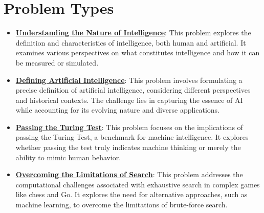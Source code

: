 \documentclass{article}%
\begin{document}
\section{Problem Types}%
\label{sec:ProblemTypes}%
\begin{itemize}[leftmargin=*]%
\item \href{https://purdue.brightspace.com/d2l/common/assets/pdfjs-d2l-dist/1.0.14-legacy/web/viewer.html?file=\%2Fcontent\%2Fenforced\%2F1095467-wl.202510.CS.24300.001\%2F02L2-Intro.pdf\%3Fou\%3D1095467\&lang=en-us\&container=d2l-fileviewer-rendered-pdf\&fullscreen=d2l-fileviewer-rendered-pdf-dialog\&height=667#page=5}{\textbf{Understanding the Nature of Intelligence}}: This problem explores the definition and characteristics of intelligence, both human and artificial. It examines various perspectives on what constitutes intelligence and how it can be measured or simulated.%
\item \href{https://purdue.brightspace.com/d2l/common/assets/pdfjs-d2l-dist/1.0.14-legacy/web/viewer.html?file=\%2Fcontent\%2Fenforced\%2F1095467-wl.202510.CS.24300.001\%2F02L2-Intro.pdf\%3Fou\%3D1095467\&lang=en-us\&container=d2l-fileviewer-rendered-pdf\&fullscreen=d2l-fileviewer-rendered-pdf-dialog\&height=667#page=5}{\textbf{Defining Artificial Intelligence}}: This problem involves formulating a precise definition of artificial intelligence, considering different perspectives and historical contexts. The challenge lies in capturing the essence of AI while accounting for its evolving nature and diverse applications.%
\item \href{https://purdue.brightspace.com/d2l/common/assets/pdfjs-d2l-dist/1.0.14-legacy/web/viewer.html?file=\%2Fcontent\%2Fenforced\%2F1095467-wl.202510.CS.24300.001\%2F02L2-Intro.pdf\%3Fou\%3D1095467\&lang=en-us\&container=d2l-fileviewer-rendered-pdf\&fullscreen=d2l-fileviewer-rendered-pdf-dialog\&height=667#page=6}{\textbf{Passing the Turing Test}}: This problem focuses on the implications of passing the Turing Test, a benchmark for machine intelligence. It explores whether passing the test truly indicates machine thinking or merely the ability to mimic human behavior.%
\item \href{https://purdue.brightspace.com/d2l/common/assets/pdfjs-d2l-dist/1.0.14-legacy/web/viewer.html?file=\%2Fcontent\%2Fenforced\%2F1095467-wl.202510.CS.24300.001\%2F02L2-Intro.pdf\%3Fou\%3D1095467\&lang=en-us\&container=d2l-fileviewer-rendered-pdf\&fullscreen=d2l-fileviewer-rendered-pdf-dialog\&height=667#page=11}{\textbf{Overcoming the Limitations of Search}}: This problem addresses the computational challenges associated with exhaustive search in complex games like chess and Go. It explores the need for alternative approaches, such as machine learning, to overcome the limitations of brute{-}force search.%

\end{itemize}
\end{document}

